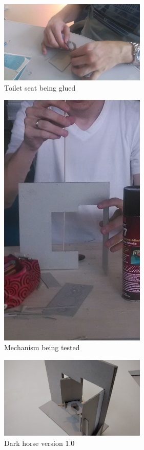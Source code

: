 \begin{figure}[h]
\centering
\includegraphics[width=7cm]{brazil_images/image026.jpg}
\caption{Toilet seat being glued}
\label{fig:toilet_glued}
\end{figure}


\begin{figure}[h]
\centering
\includegraphics[width=7cm]{brazil_images/image027.jpg}
\caption{Mechanism being tested}
\label{fig:test}
\end{figure}


\begin{figure}[h]
\centering
\includegraphics[width=7cm]{brazil_images/image028.jpg}
\caption{Dark horse version 1.0}
\label{fig:dark_horse_brazil}
\end{figure}

